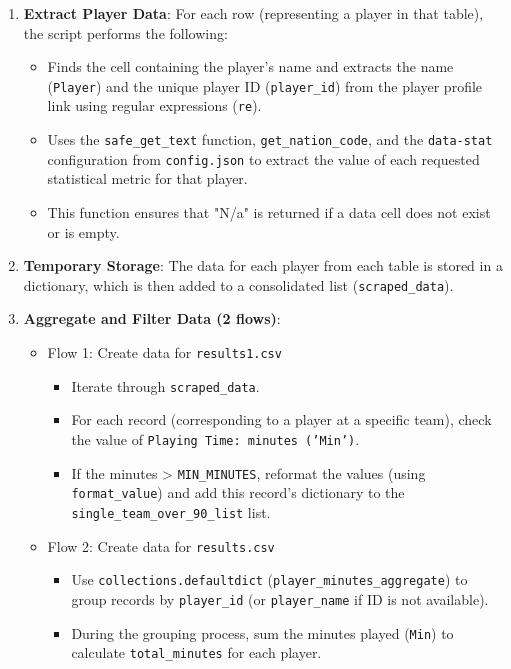 \documentclass[12pt, a4paper]{report}
\begin{document}
\begin{enumerate}[label=\textbf{Step \arabic*:}, leftmargin=*]
\begin{itemize}[leftmargin=0em]
    \end{itemize}
    \item \textbf{Extract Player Data}: For each row (representing a player in that table), the script performs the following:
    \begin{itemize}[leftmargin=0em]
        \item Finds the cell containing the player's name and extracts the name (\texttt{Player}) and the unique player ID (\texttt{player\_id}) from the player profile link using regular expressions (\texttt{re}).
        \item Uses the \texttt{safe\_get\_text} function, \texttt{get\_nation\_code}, and the \texttt{data-stat} configuration from \texttt{config.json} to extract the value of each requested statistical metric for that player.
        \item This function ensures that "N/a" is returned if a data cell does not exist or is empty.
    \end{itemize}
    \item \textbf{Temporary Storage}: The data for each player from each table is stored in a dictionary, which is then added to a consolidated list (\texttt{scraped\_data}).
    \item \textbf{Aggregate and Filter Data (2 flows)}:
    \begin{itemize}[leftmargin=0em]
        \item Flow 1: Create data for \texttt{results1.csv}
        \begin{itemize}
            \item Iterate through \texttt{scraped\_data}.
            \item For each record (corresponding to a player at a specific team), check the value of \texttt{Playing Time: minutes ('Min')}.
            \item If the minutes > \texttt{MIN\_MINUTES}, reformat the values (using \texttt{format\_value}) and add this record's dictionary to the \sloppypar
            \texttt{single\_team\_over\_90\_list} list.
        \end{itemize}
        \item Flow 2: Create data for \texttt{results.csv}
        \begin{itemize}
            \item Use \texttt{collections.defaultdict} (\texttt{player\_minutes\_aggregate}) to group records by \texttt{player\_id} (or \texttt{player\_name} if ID is not available).
            \item During the grouping process, sum the minutes played (\texttt{Min}) to calculate \texttt{total\_minutes} for each player.

\end{itemize}
\end{itemize}
\end{enumerate}
\end{document}
